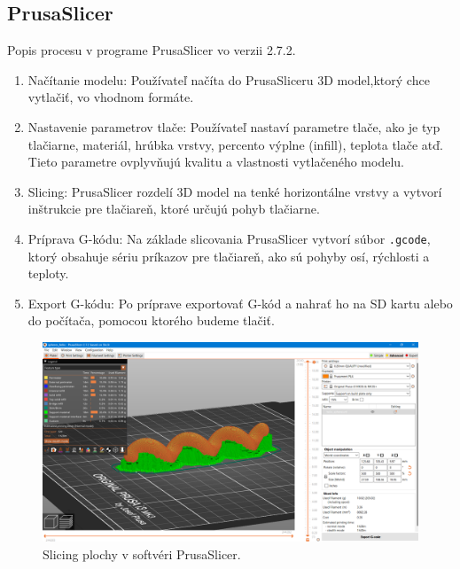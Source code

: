 \subsection{PrusaSlicer}
Popis procesu v programe PrusaSlicer vo verzii 2.7.2.
\begin{enumerate}
\item Načítanie modelu: Používateľ načíta do PrusaSliceru 3D model,ktorý chce vytlačiť, vo vhodnom formáte.

\item Nastavenie parametrov tlače: Používateľ nastaví parametre tlače, ako je typ tlačiarne, materiál, hrúbka vrstvy, percento výplne (infill), teplota tlače atď. Tieto parametre ovplyvňujú kvalitu a vlastnosti vytlačeného modelu.

\item Slicing: PrusaSlicer rozdelí 3D model na tenké horizontálne vrstvy a vytvorí inštrukcie pre tlačiareň, ktoré určujú pohyb tlačiarne. 

\item Príprava G-kódu: Na základe slicovania PrusaSlicer vytvorí súbor \verb|.gcode|, ktorý obsahuje sériu príkazov pre tlačiareň, ako sú pohyby osí, rýchlosti a teploty.

\item Export G-kódu: Po príprave exportovať G-kód a nahrať ho na SD kartu alebo do počítača, pomocou ktorého budeme tlačiť.
\end{enumerate}

\begin{figure}[h!]
	\centering
	\includegraphics[width=\textwidth]{images/prusaslicer.png}
	\caption[Softvér PrusaSlicer.]{Slicing plochy v softvéri PrusaSlicer.}
	\label{fig:prusaslicer}
\end{figure}

